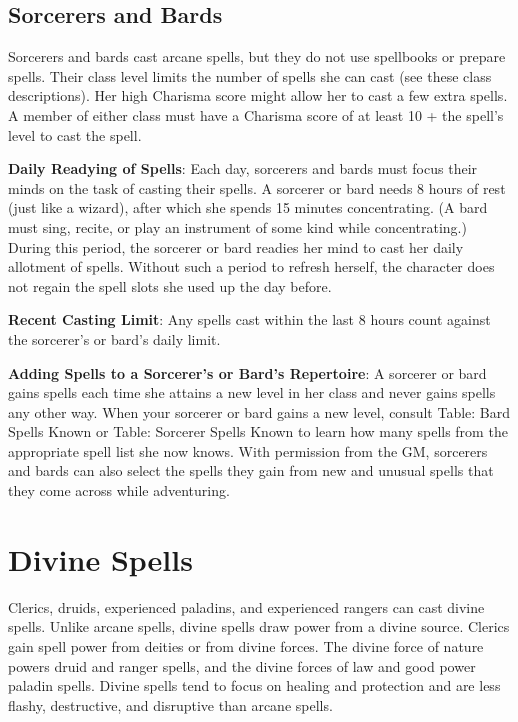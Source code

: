 \subsection{Sorcerers and Bards}

				
Sorcerers and bards cast arcane spells, but they do not use spellbooks or prepare spells. Their class level limits the number of spells she can cast (see these class descriptions). Her high Charisma score might allow her to cast a few extra spells. A member of either class must have a Charisma score of at least 10 + the spell's level to cast the spell.
				
\textbf{Daily Readying of Spells}: Each day, sorcerers and bards must focus their minds on the task of casting their spells. A sorcerer or bard needs 8 hours of rest (just like a wizard), after which she spends 15 minutes concentrating. (A bard must sing, recite, or play an instrument of some kind while concentrating.) During this period, the sorcerer or bard readies her mind to cast her daily allotment of spells. Without such a period to refresh herself, the character does not regain the spell slots she used up the day before.
				
\textbf{Recent Casting Limit}: Any spells cast within the last 8 hours count against the sorcerer's or bard's daily limit.
				
\textbf{Adding Spells to a Sorcerer's or Bard's Repertoire}: A sorcerer or bard gains spells each time she attains a new level in her class and never gains spells any other way. When your sorcerer or bard gains a new level, consult Table: Bard Spells Known or Table: Sorcerer Spells Known to learn how many spells from the appropriate spell list she now knows. With permission from the GM, sorcerers and bards can also select the spells they gain from new and unusual spells that they come across while adventuring.
				
\section{Divine Spells}

				
Clerics, druids, experienced paladins, and experienced rangers can cast divine spells. Unlike arcane spells, divine spells draw power from a divine source. Clerics gain spell power from deities or from divine forces. The divine force of nature powers druid and ranger spells, and the divine forces of law and good power paladin spells. Divine spells tend to focus on healing and protection and are less flashy, destructive, and disruptive than arcane spells.
				

